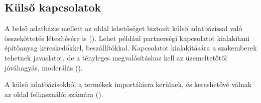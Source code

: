 \subsection{Külső kapcsolatok}
A belső adatbázis mellett az oldal lehetőséget biztosít külső adatbázissal való összeköttetés létesítésére is (). Lehet például partnerségi kapcsolatot kialakítani építőanyag kereskedőkkel, beszállítókkal. Kapcsolatot kialakítására a szakemberek tehetnek javaslatot, de a tényleges megvalósításhoz kell az üzemeltetőtől jóváhagyás, moderálás ().


A külső adatbázisokból a termékek importálásra kerülnek, és kereshetővé válnak az oldal felhasználói számára ().



